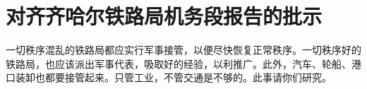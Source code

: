\section[对齐齐哈尔铁路局机务段报告的批示（一九六七年三月二十日）]{对齐齐哈尔铁路局机务段报告的批示}


一切秩序混乱的铁路局都应实行军事接管，以便尽快恢复正常秩序。一切秩序好的铁路局，也应该派出军事代表，吸取好的经验，以利推广。此外，汽车、轮船、港口装卸也都要接管起来。只管工业，不管交通是不够的。此事请你们研究。


